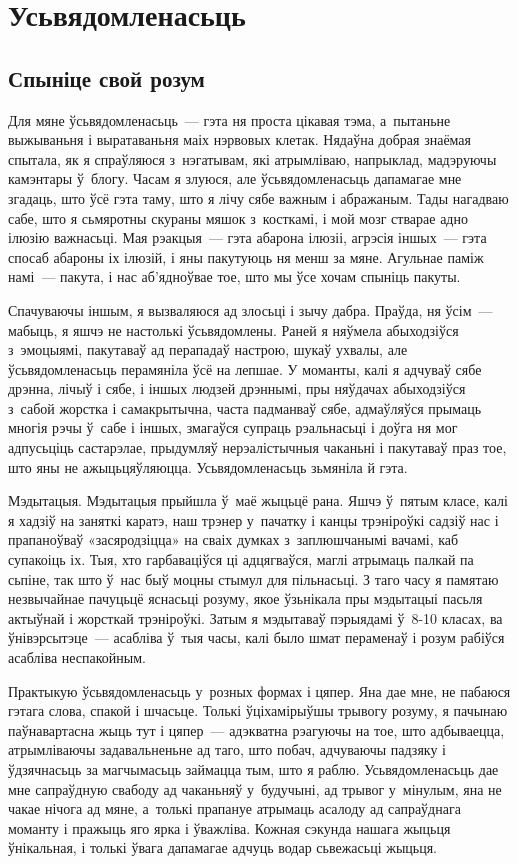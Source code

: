 \chapter{Усьвядомленасьць}

\section{Спыніце свой розум}

Для мяне ўсьвядомленасьць~--- гэта ня проста цікавая тэма, а~пытаньне выжываньня і выратаваньня маіх нэрвовых клетак. Нядаўна добрая знаёмая спытала, як я спраўляюся з~нэгатывам, які атрымліваю, напрыклад, мадэруючы камэнтары ў~блогу. Часам я злуюся, але ўсьвядомленасьць дапамагае мне згадаць, што ўсё гэта таму, што я лічу сябе важным і абражаным. Тады нагадваю сабе, што я сьмяротны скураны мяшок з~косткамі, і мой мозг стварае адно ілюзію важнасьці. Мая рэакцыя~--- гэта абарона ілюзіі, агрэсія іншых~--- гэта спосаб абароны іх ілюзій, і яны пакутуюць ня менш за мяне. Агульнае паміж намі~--- пакута, і нас аб'ядноўвае тое, што мы ўсе хочам спыніць пакуты.

Спачуваючы іншым, я вызваляюся ад злосьці і зычу дабра. Праўда, ня ўсім~--- мабыць, я яшчэ не настолькі ўсьвядомлены. Раней я няўмела абыходзіўся з~эмоцыямі, пакутаваў ад перападаў настрою, шукаў ухвалы, але ўсьвядомленасьць перамяніла ўсё на лепшае. У моманты, калі я адчуваў сябе дрэнна, лічыў і сябе, і іншых людзей дрэннымі, пры няўдачах абыходзіўся з~сабой жорстка і самакрытычна, часта падманваў сябе, адмаўляўся прымаць многія рэчы ў~сабе і іншых, змагаўся супраць рэальнасьці і доўга ня мог адпусьціць састарэлае, прыдумляў нерэалістычныя чаканьні і пакутаваў праз тое, што яны не ажыцьцяўляюцца. Усьвядомленасьць зьмяніла й гэта.

Мэдытацыя. Мэдытацыя прыйшла ў~маё жыцьцё рана. Яшчэ ў~пятым класе, калі я хадзіў на заняткі каратэ, наш трэнер у~пачатку і канцы трэніроўкі садзіў нас і прапаноўваў «засяродзіцца» на сваіх думках з~заплюшчанымі вачамі, каб супакоіць іх. Тыя, хто гарбаваціўся ці адцягваўся, маглі атрымаць палкай па сьпіне, так што ў~нас быў моцны стымул для пільнасьці. З таго часу я памятаю незвычайнае пачуцьцё яснасьці розуму, якое ўзьнікала пры мэдытацыі пасьля актыўнай і жорсткай трэніроўкі. Затым я мэдытаваў пэрыядамі ў~8-10 класах, ва ўнівэрсытэце~--- асабліва ў~тыя часы, калі было шмат пераменаў і розум рабіўся асабліва неспакойным.

Практыкую ўсьвядомленасьць у~розных формах і цяпер. Яна дае мне, не пабаюся гэтага слова, спакой і шчасьце. Толькі ўціхамірыўшы трывогу розуму, я пачынаю паўнавартасна жыць тут і цяпер~--- адэкватна рэагуючы на тое, што адбываецца, атрымліваючы задавальненьне ад таго, што побач, адчуваючы падзяку і ўдзячнасьць за магчымасьць займацца тым, што я раблю. Усьвядомленасьць дае мне сапраўдную свабоду ад чаканьняў у~будучыні, ад трывог у~мінулым, яна не чакае нічога ад мяне, а~толькі прапануе атрымаць асалоду ад сапраўднага моманту і пражыць яго ярка і ўважліва. Кожная сэкунда нашага жыцьця ўнікальная, і толькі ўвага дапамагае адчуць водар сьвежасьці жыцьця.

